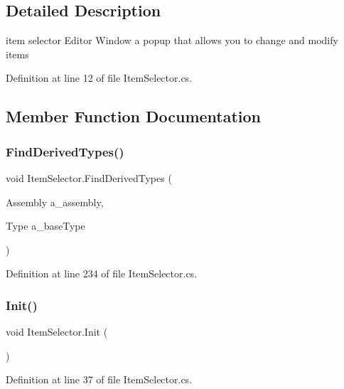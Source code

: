 \subsection{Detailed Description}
item selector Editor Window a popup that allows you to change and modify items 



Definition at line 12 of file Item\+Selector.\+cs.



\subsection{Member Function Documentation}
\mbox{\label{class_item_selector_a94d75921f097ad73cd36d55d0e309f5e}} 
\subsubsection{\texorpdfstring{Find\+Derived\+Types()}{FindDerivedTypes()}}
{\footnotesize\ttfamily void Item\+Selector.\+Find\+Derived\+Types (\begin{DoxyParamCaption}\item[{Assembly}]{a\+\_\+assembly,  }\item[{Type}]{a\+\_\+base\+Type }\end{DoxyParamCaption})}



Definition at line 234 of file Item\+Selector.\+cs.

\mbox{\label{class_item_selector_a51e8782eaf95ac0477bf971f629647d2}} 
\subsubsection{\texorpdfstring{Init()}{Init()}}
{\footnotesize\ttfamily void Item\+Selector.\+Init (\begin{DoxyParamCaption}{ }\end{DoxyParamCaption})}



Definition at line 37 of file Item\+Selector.\+cs.

\mbox{\label{class_item_selector_a99398e8dcd0774a09cee6e1c7a452e76}} 
